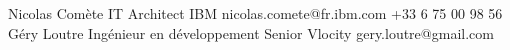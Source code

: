 %
%
%


\begin{referees}
		{Nicolas Comète}
		{IT Architect}
		{IBM}
		{nicolas.comete@fr.ibm.com}
		{+33 6 75 00 98 56}
		{Géry Loutre}
		{Ingénieur en développement Senior}
		{Vlocity}
		{gery.loutre@gmail.com}
\end{referees}